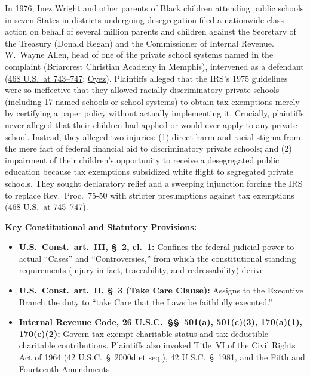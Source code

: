 \documentclass[12pt]{article}
\begin{document}
In 1976, Inez Wright and other parents of Black children attending public schools in seven States in districts undergoing desegregation filed a nationwide class action on behalf of several million parents and children against the Secretary of the Treasury (Donald Regan) and the Commissioner of Internal Revenue. W.\ Wayne Allen, head of one of the private school systems named in the complaint (Briarcrest Christian Academy in Memphis), intervened as a defendant (\href{https://supreme.justia.com/cases/federal/us/468/737/}{468 U.S.\ at 743--747}; \href{https://www.oyez.org/cases/1983/81-757}{Oyez}). Plaintiffs alleged that the IRS's 1975 guidelines were so ineffective that they allowed racially discriminatory private schools (including 17 named schools or school systems) to obtain tax exemptions merely by certifying a paper policy without actually implementing it. Crucially, plaintiffs never alleged that their children had applied or would ever apply to any private school. Instead, they alleged two injuries: (1) direct harm and racial stigma from the mere fact of federal financial aid to discriminatory private schools; and (2) impairment of their children's opportunity to receive a desegregated public education because tax exemptions subsidized white flight to segregated private schools. They sought declaratory relief and a sweeping injunction forcing the IRS to replace Rev.\ Proc.\ 75-50 with stricter presumptions against tax exemptions (\href{https://supreme.justia.com/cases/federal/us/468/737/}{468 U.S.\ at 745--747}).

\textbf{Key Constitutional and Statutory Provisions:}
\begin{itemize}
  \item \textbf{U.S.\ Const.\ art.\ III, \S~2, cl.\ 1:} Confines the federal judicial power to actual ``Cases'' and ``Controversies,'' from which the constitutional standing requirements (injury in fact, traceability, and redressability) derive.
  \item \textbf{U.S.\ Const.\ art.\ II, \S~3 (Take Care Clause):} Assigns to the Executive Branch the duty to ``take Care that the Laws be faithfully executed.''
  \item \textbf{Internal Revenue Code, 26 U.S.C.\ \S\S~501(a), 501(c)(3), 170(a)(1), 170(c)(2):} Govern tax-exempt charitable status and tax-deductible charitable contributions. Plaintiffs also invoked Title~VI of the Civil Rights Act of 1964 (42 U.S.C.\ \S~2000d et seq.), 42 U.S.C.\ \S~1981, and the Fifth and Fourteenth Amendments.
\end{itemize}
\end{document}
